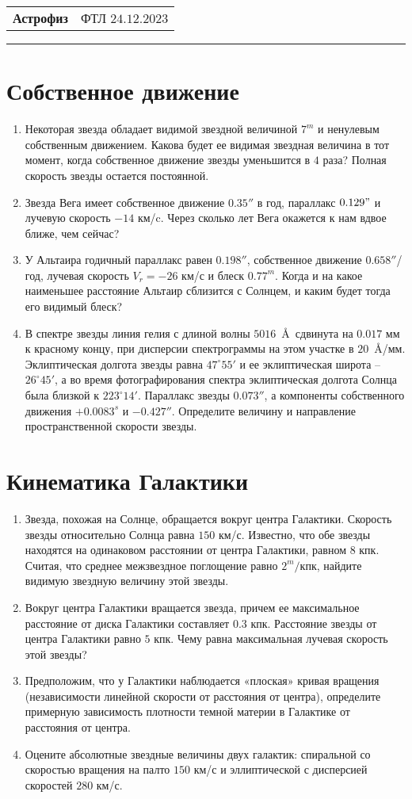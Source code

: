 \documentclass[12pt]{article}
\begin{document}
\begin{tabularx}{\textwidth}{Xr}
{\Large \textbf{Астрофиз}} & ФТЛ $24.12.2023$ \\
\end{tabularx}
\noindent\rule{\textwidth}{0.4pt}
\section*{Собственное движение}
\begin{enumerate}
    \item Некоторая звезда обладает видимой звездной величиной $7^m$ и ненулевым собственным движением. Какова будет ее видимая звездная величина в тот момент, когда собственное движение звезды уменьшится в $4$ раза? Полная скорость звезды остается постоянной.
    \item Звезда Вега имеет собственное движение $0.35''$ в год, параллакс $0.129"$ и лучевую скорость $-14$ км/c. Через сколько лет Вега окажется к нам вдвое ближе, чем сейчас?
    \item У Альтаира годичный параллакс равен $0.198''$, собственное движение $0.658''$/год, лучевая скорость $V_r =- 26$ км/с и блеск $0.77^m$. Когда и на какое наименьшее расстояние Альтаир сблизится с Солнцем, и каким будет тогда его видимый блеск?
    \item В спектре звезды линия гелия с длиной волны $5016$~\AA~сдвинута на $0.017$ мм к красному концу, при дисперсии спектрограммы на этом участке в $20$~\AA/мм. Эклиптическая долгота звезды равна $47^{\circ}55'$ и ее эклиптическая широта -- $26^{\circ}45'$, а во время фотографирования спектра эклиптическая долгота Солнца была близкой к $223^{\circ}14'$. Параллакс звезды $0.073''$, а компоненты собственного движения $+0.0083^s$ и $-0.427''$. Определите величину и направление пространственной скорости звезды.
\end{enumerate}
\section*{Кинематика Галактики}
\begin{enumerate}[resume]
    \item Звезда, похожая на Солнце, обращается вокруг центра Галактики. Скорость звезды относительно Солнца равна $150$ км/с. Известно, что обе звезды находятся на одинаковом расстоянии от центра Галактики, равном $8$ кпк. Считая, что среднее межзвездное поглощение равно $2^m/\mbox{кпк}$, найдите видимую звездную величину этой звезды.
    \item Вокруг центра Галактики вращается звезда, причем ее максимальное расстояние от диска Галактики составляет $0.3$ кпк. Расстояние звезды от центра Галактики равно $5$ кпк. Чему равна максимальная лучевая скорость этой звезды?
    \item Предположим, что у Галактики наблюдается «плоская» кривая вращения (независимости линейной скорости от расстояния от центра), определите примерную зависимость плотности темной материи в Галактике от расстояния от центра.
    \item Оцените абсолютные звездные величины двух галактик: спиральной со скоростью вращения на палто $150$ км/с и эллиптической с дисперсией скоростей $280$ км/с.
\end{enumerate}
\end{document}

